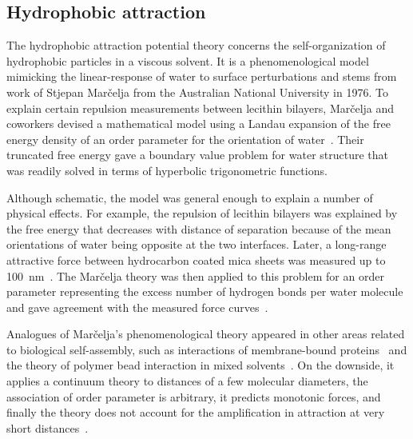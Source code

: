 \subsection{Hydrophobic attraction}
The hydrophobic attraction potential theory concerns the self-organization of
hydrophobic particles in a viscous solvent. It is a phenomenological
model mimicking the linear-response of water to surface perturbations
and stems from work of Stjepan Mar\v{c}elja
from the Australian National University in 1976. To explain certain
repulsion measurements between lecithin bilayers, Mar\v{c}elja and
coworkers devised a mathematical model using a Landau expansion of the
free energy density of an order parameter for the orientation of
water~\cite{LeRaPa77, MaRa76, LANDAULIFSHITZ5}. Their truncated free
energy gave a boundary value problem for water structure that was
readily solved in terms of hyperbolic trigonometric functions. 

Although schematic, the model was general enough to explain a number of
physical effects. For example, the repulsion of lecithin bilayers
was explained by the free energy that decreases with distance of
separation because of the mean orientations of water being opposite at
the two interfaces. Later, a long-range attractive force between
hydrocarbon coated mica sheets was measured up to
100~nm~\cite{ClCh88,RaDe88}. The Mar\v{c}elja
theory was then applied to this problem for an order parameter
representing the excess number of hydrogen bonds per water
molecule and gave agreement with the measured force
curves~\cite{ErLjCl89}.


Analogues of Mar\v{c}elja's phenomenological theory appeared in other
areas related to biological self-assembly, such as interactions of
membrane-bound proteins~\cite{KoNa15, Nagle17, KUZMIN2005} and the 
theory of polymer bead interaction in mixed
solvents~\cite{deGe76}.
On the downside, it applies a continuum theory to distances of a few
molecular diameters, the association of order parameter is arbitrary, it
predicts monotonic forces, and finally the theory does not account
for the amplification in attraction at very short distances~\cite{Ni80}.

